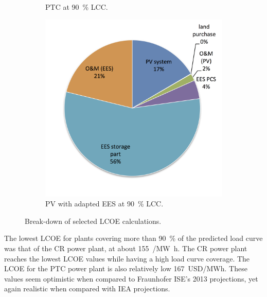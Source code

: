 \begin{figure}[htbp]
\begin{subfigure}[b]{0.5\textwidth}
                \caption{PTC at \SI{90}{\percent} LCC.}\label{PTC_LCOE_90_BreakDown}
        \end{subfigure}
\par\medskip %
        \begin{subfigure}[b]{0.5\textwidth}
                \centering
                \includegraphics[width=1\textwidth]{FIG/PV_LCOE_90_BreakDown}
                \caption{PV with adapted EES at \SI{90}{\percent} LCC.}\label{PV_LCOE_90_BreakDown}
        \end{subfigure}
        \caption{Break-down of selected LCOE calculations.}\label{SMPV_LCOE_BreakDown}
\end{figure}
The lowest \ac{LCOE} for plants covering more than \SI{90}{\percent} of the predicted load curve was that of the \ac{CR} power plant, at about \SI{155}{\usd/\mega\watt\hour}. The \ac{CR} power plant reaches the lowest \ac{LCOE} values while having a high load curve coverage. The \ac{LCOE} for the \ac{PTC} power plant is also relatively low \SI{167}{USD/MWh}. These values seem optimistic when compared to Fraunhofer ISE's 2013 projections, yet again realistic when compared with \ac{IEA} projections.

